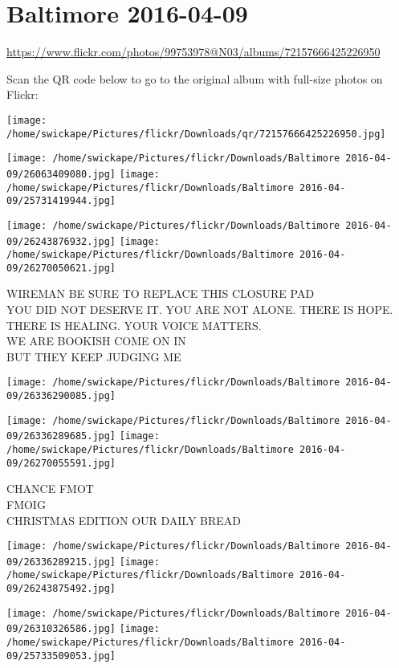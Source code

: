\documentclass[10pt,letterpaper]{article}
\title{}
\author{}
\date{}
\begin{document}
\section*{Baltimore 2016-04-09}

\url{https://www.flickr.com/photos/99753978@N03/albums/72157666425226950}

Scan the QR code below to go to the original album with full-size photos on Flickr:

\texttt{[image: /home/swickape/Pictures/flickr/Downloads/qr/72157666425226950.jpg]}
\pagebreak

\texttt{[image: /home/swickape/Pictures/flickr/Downloads/Baltimore 2016-04-09/26063409080.jpg]}
\texttt{[image: /home/swickape/Pictures/flickr/Downloads/Baltimore 2016-04-09/25731419944.jpg]}

\texttt{[image: /home/swickape/Pictures/flickr/Downloads/Baltimore 2016-04-09/26243876932.jpg]}
\texttt{[image: /home/swickape/Pictures/flickr/Downloads/Baltimore 2016-04-09/26270050621.jpg]}

WIREMAN BE SURE TO REPLACE THIS CLOSURE PAD\\
YOU DID NOT DESERVE IT. YOU ARE NOT ALONE. THERE IS HOPE. THERE IS HEALING. YOUR VOICE MATTERS.\\
WE ARE BOOKISH COME ON IN\\
BUT THEY KEEP JUDGING ME
\pagebreak

\texttt{[image: /home/swickape/Pictures/flickr/Downloads/Baltimore 2016-04-09/26336290085.jpg]}

\vspace{0.25in}
\texttt{[image: /home/swickape/Pictures/flickr/Downloads/Baltimore 2016-04-09/26336289685.jpg]}
\texttt{[image: /home/swickape/Pictures/flickr/Downloads/Baltimore 2016-04-09/26270055591.jpg]}

CHANCE FMOT\\
FMOIG\\
CHRISTMAS EDITION OUR DAILY BREAD
\pagebreak

\texttt{[image: /home/swickape/Pictures/flickr/Downloads/Baltimore 2016-04-09/26336289215.jpg]}
\texttt{[image: /home/swickape/Pictures/flickr/Downloads/Baltimore 2016-04-09/26243875492.jpg]}

\texttt{[image: /home/swickape/Pictures/flickr/Downloads/Baltimore 2016-04-09/26310326586.jpg]}
\texttt{[image: /home/swickape/Pictures/flickr/Downloads/Baltimore 2016-04-09/25733509053.jpg]}
\end{document}
